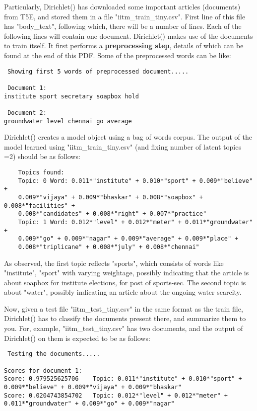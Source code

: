 \documentclass[addpoints,11pt,a4paper]{exam}
\begin{document}
\begin{questions}
Particularly, Dirichlet() has downloaded some important articles (documents) from T5E, and stored them in a file "iitm\_train\_tiny.csv". First line of this file has "body\_text", following which, there will be a number of lines. Each of the following lines will contain one document. Dirichlet() makes use of the documents to train itself. It first performs a \textbf{preprocessing step}, details of which can be found at the end of this PDF. Some of the preprocessed words can be like:
\begin{lstlisting}
 Showing first 5 words of preprocessed document.....

 Document 1:
institute sport secretary soapbox hold

 Document 2:
groundwater level chennai go average

\end{lstlisting}

Dirichlet() creates a model object using a bag of words corpus. The output of the model learned using "iitm\_train\_tiny.csv" (and fixing number of latent topics =2) should be as follows:
\begin{lstlisting} 
    Topics found:
    Topic: 0 Word: 0.011*"institute" + 0.010*"sport" + 0.009*"believe" + 
    0.009*"vijaya" + 0.009*"bhaskar" + 0.008*"soapbox" + 0.008*"facilities" + 
    0.008*"candidates" + 0.008*"right" + 0.007*"practice"
    Topic: 1 Word: 0.012*"level" + 0.012*"meter" + 0.011*"groundwater" + 
    0.009*"go" + 0.009*"nagar" + 0.009*"average" + 0.009*"place" + 
    0.008*"triplicane" + 0.008*"july" + 0.008*"chennai"
\end{lstlisting}
As observed, the first topic reflects "sports", which consists of words like "institute", "sport" with varying weightage, possibly indicating that the article is about soapbox for institute elections, for post of sports-sec. The second topic is about "water", possibly indicating an article about the ongoing water scarcity.

Now, given a test file "iitm\_test\_tiny.csv" in the same format as the train file, Dirichlet() has to classify the documents present there, and summarize them to you. For, example, "iitm\_test\_tiny.csv" has two documents, and the output of Dirichlet() on them is expected to be as follows:
\begin{lstlisting}
 Testing the documents.....

Scores for document 1:
Score: 0.979525625706	 Topic: 0.011*"institute" + 0.010*"sport" +
0.009*"believe" + 0.009*"vijaya" + 0.009*"bhaskar"
Score: 0.0204743854702	 Topic: 0.012*"level" + 0.012*"meter" +
0.011*"groundwater" + 0.009*"go" + 0.009*"nagar"


\end{lstlisting}
\end{questions}
\end{document}
